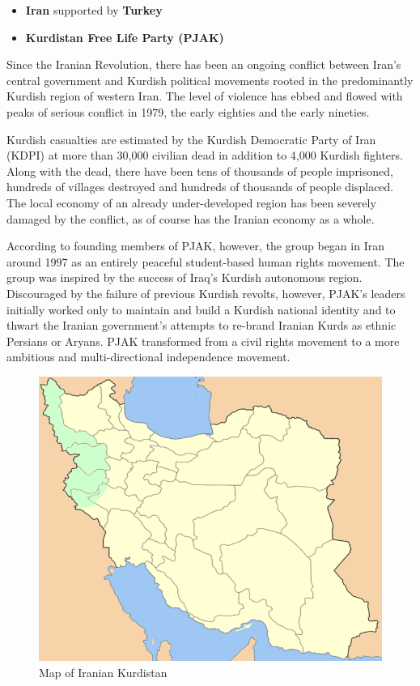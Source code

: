 \begin{itemize}
	\item \textbf{Iran}
		\subitem supported by \textbf{Turkey}
	\item \textbf{Kurdistan Free Life Party (PJAK)}
\end{itemize}

Since the Iranian Revolution, there has been an ongoing conflict between Iran’s central government and Kurdish political movements rooted in the predominantly Kurdish region of western Iran. The level of violence has ebbed and flowed with peaks of serious conflict in 1979, the early eighties and the early nineties.

Kurdish casualties are estimated by the Kurdish Democratic Party of Iran (KDPI) at more than 30,000 civilian dead in addition to 4,000 Kurdish fighters. Along with the dead, there have been tens of thousands of people imprisoned, hundreds of villages destroyed and hundreds of thousands of people displaced. The local economy of an already under-developed region has been severely damaged by the conflict, as of course has the Iranian economy as a whole.

According to founding members of PJAK, however, the group began in Iran around 1997 as an entirely peaceful student-based human rights movement. The group was inspired by the success of Iraq's Kurdish autonomous region. Discouraged by the failure of previous Kurdish revolts, however, PJAK's leaders initially worked only to maintain and build a Kurdish national identity and to thwart the Iranian government's attempts to re-brand Iranian Kurds as ethnic Persians or Aryans.
PJAK transformed from a civil rights movement to a more ambitious and multi-directional independence movement.
\newpage



\begin{figure}[!h]
	\begin{center}
		\includegraphics[width=0.5\linewidth]{images/Map_of_Iranian_Kurdistan}
		\caption{Map of Iranian Kurdistan}
	\end{center}
\end{figure}

